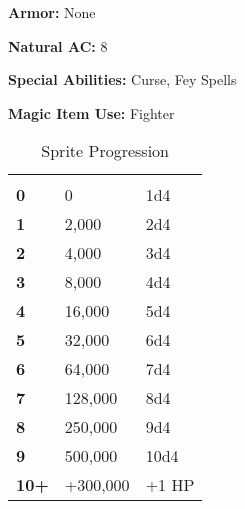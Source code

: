 \begin{multicols*}{2}
{\textbf{Armor:} None

\textbf{Natural AC:} 8

\textbf{Special Abilities:} Curse, Fey Spells

\textbf{Magic Item Use:} Fighter}

\begin {table}[H]
  \caption{Sprite Progression}
  \begin{tabularx}{\columnwidth}{>{\bfseries}YYY}
   &  & \\
	0 & 0 & 1d4\\
	1 & 2,000 & 2d4\\
	2 & 4,000 & 3d4\\
	3 & 8,000 & 4d4\\
	4 & 16,000 & 5d4\\
	5 & 32,000 & 6d4\\
	6 & 64,000 & 7d4\\
	7 & 128,000 & 8d4\\
	8 & 250,000 & 9d4\\
	9 & 500,000 & 10d4\\
	10+ & +300,000 & +1 HP
  \end {tabularx}
\end {table}



\end{multicols*}
